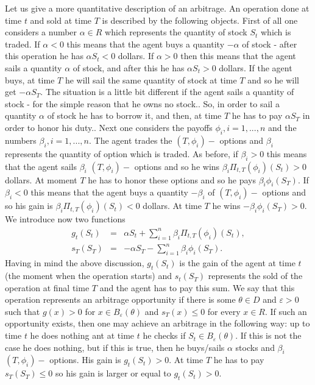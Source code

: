 \documentclass[a4paper]{article}
\begin{document}
Let us give a more quantitative description of an arbitrage. An operation
done at time $t$ and sold at time $T$ is described by the following
objects. First of all one considers a number $\alpha \in R$ which represents
the quantity of stock $S_{t}$ which is traded. If $\alpha <0$ this means
that the agent buys a quantity $-\alpha $ of stock - after this operation he
has $\alpha S_{t}<0$ dollars. If $\alpha >0$ then this means that the agent
sails a quantity $\alpha $ of stock, and after this he has $\alpha S_{t}>0$
dollars. If the agent buys, at time $T$ he will sail the same quantity of
stock at time $T$ and so he will get $-\alpha S_{T}.$ The situation is a
little bit different if the agent sails a quantity of stock - for the simple
reason that he owns no stock.. So, in order to sail a quantity $\alpha $ of
stock he has to borrow it, and then, at time $T$ he has to pay $\alpha S_{T}$
in order to honor his duty.. Next one considers the payoffs $\phi
_{i},i=1,...,n$ and the numbers $\beta _{i},i=1,...,n.$ The agent trades the
$(T,\phi _{i})-$ options and $\beta _{i}$ represents the quantity of option
which is traded. As before, if $\beta _{i}>0$ this means that the agent
sails $\beta _{i}$ $(T,\phi _{i})-$ options and so he wins $\beta _{i}\Pi
_{t,T}(\phi _{i})(S_{t})>0$ dollars. At moment $T$ he has to honor these
options and so he pays $\beta _{i}\phi _{i}(S_{T}).$ If $\beta _{i}<0$ this
means that the agent buys a quantity $-\beta _{i}$ of $(T,\phi _{i})-$
options and so his gain is $\beta _{i}\Pi _{t,T}(\phi _{i})(S_{t})<0$
dollars. At time $T$ he wins $-\beta _{i}\phi _{i}(S_{T})>0.$ We introduce
now two functions
\begin{eqnarray*}
g_{t}(S_{t}) &=&\alpha S_{t}+\sum_{i=1}^{n}\beta _{i}\Pi _{t,T}(\phi
_{i})(S_{t}), \\
s_{T}(S_{T}) &=&-\alpha S_{T}-\sum_{i=1}^{n}\beta _{i}\phi _{i}(S_{T}).
\end{eqnarray*}
Having in mind the above discussion, $g_{t}(S_{t})$ is the gain of the agent
at time $t$ (the moment when the operation starts) and $s_{t}(S_{T})$
represents the sold of the operation at final time $T$ and the agent has to
pay this sum. We say that this operation represents an arbitrage opportunity
if there is some $\theta \in D$ and $\varepsilon >0$ such that $g(x)>0$ for $%
x\in B_{\varepsilon }(\theta )$ and $s_{T}(x)\leq 0$ for every $x\in R.$ If
such an opportunity exists, then one may achieve an arbitrage in the
following way: up to time $t$ he does nothing ant at time $t$ he checks if $%
S_{t}\in B_{\varepsilon }(\theta ).$ If this is not the case he does
nothing, but if this is true, then he buys/sails $\alpha $ stocks and $\beta
_{i}$ $(T,\phi _{i})-$ options. His gain is $g_{t}(S_{t})>0.$ At time $T$ he
has to pay $s_{T}(S_{T})\leq 0$ so his gain is larger or equal to $%
g_{t}(S_{t})>0.$
\end{document}

